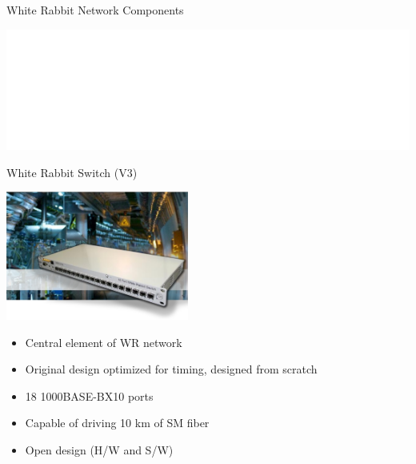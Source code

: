 \documentclass[compress,red]{beamer}
\begin{document}
\subsection{}
\begin{frame}{White Rabbit Network Components}


    \begin{center}
    \includegraphics<1>[width=1.0\textwidth]{network/WRnetwork-eva.pdf}  %
    \end{center}

\end{frame}
\begin{frame}{White Rabbit Switch (V3)}

    \begin{center}
     \includegraphics[width=6.0cm]{switch/wrSwitchV3.jpg}
    \end{center}

	\begin{itemize}
	\item Central element of WR network
	\item Original design optimized for timing, designed from scratch
	\item 18 1000BASE-BX10 ports
	\item Capable of driving 10 km of SM fiber
	\item Open design (H/W and S/W)
	\end{itemize}

\end{frame}
\end{document}
